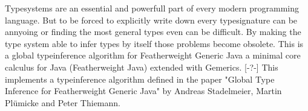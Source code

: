 Typesystems are an essential and powerfull part of every modern programming language.
But to be forced to explicitly write down every typesignature can be annyoing or
finding the most general types even can be difficult.
By making the type system able to infer types by itself those problems become obsolete.
This is a global typeinference algorithm for Featherweight Generic Java a minimal core calculus for Java (Featherweight Java) extended with Gemerics.
[-?-] This implements a typeinference algorithm defined in the paper "Global Type Inference for Featherweight Generic
Java" by Andreas Stadelmeier, Martin Plümicke and Peter Thiemann.
